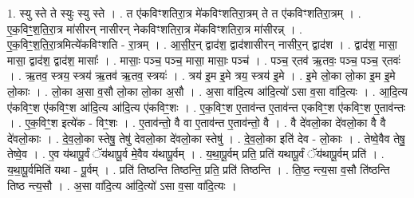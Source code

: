 \documentclass[17pt]{extarticle}
\begin{document}
1. स्यु स्ते ते स्युः स्यु स्ते । . त ए॑कविꣳशतिरा॒त्र मे॑कविꣳशतिरा॒त्रम् ते त ए॑कविꣳशतिरा॒त्रम् । . ए॒क॒विꣳ॒॒श॒ति॒रा॒त्र मा॑सीरन् नासीरन् नेकविꣳशतिरा॒त्र मे॑कविꣳशतिरा॒त्र मा॑सीरन्न् । . ए॒क॒विꣳ॒॒श॒ति॒रा॒त्रमित्ये॑कविꣳशति - रा॒त्रम् । . आ॒सी॒र॒न् द्वाद॑श॒ द्वाद॑शासीरन् नासीर॒न् द्वाद॑श । . द्वाद॑श॒ मासा॒ मासा॒ द्वाद॑श॒ द्वाद॑श॒ मासाः᳚ । . मासाः॒ पञ्च॒ पञ्च॒ मासा॒ मासाः॒ पञ्च॑ । . पञ्च॒ र्‌तव॑ ऋ॒तवः॒ पञ्च॒ पञ्च॒ र्‌तवः॑ । . ऋ॒तव॒ स्त्रय॒ स्त्रय॑ ऋ॒तव॑ ऋ॒तव॒ स्त्रयः॑ । . त्रय॑ इ॒म इ॒मे त्रय॒ स्त्रय॑ इ॒मे । . इ॒मे लो॒का लो॒का इ॒म इ॒मे लो॒काः । . लो॒का अ॒सा व॒सौ लो॒का लो॒का अ॒सौ । . अ॒सा वा॑दि॒त्य आ॑दि॒त्यो॑ ऽसा व॒सा वा॑दि॒त्यः । . आ॒दि॒त्य ए॑कविꣳ॒॒श ए॑कविꣳ॒॒श आ॑दि॒त्य आ॑दि॒त्य ए॑कविꣳ॒॒शः । . ए॒क॒विꣳ॒॒श ए॒ताव॑न्त ए॒ताव॑न्त एकविꣳ॒॒श ए॑कविꣳ॒॒श ए॒ताव॑न्तः । . ए॒क॒विꣳ॒॒श इत्ये॑क - विꣳ॒॒शः । . ए॒ताव॑न्तो॒ वै वा ए॒ताव॑न्त ए॒ताव॑न्तो॒ वै । . वै दे॑वलो॒का दे॑वलो॒का वै वै दे॑वलो॒काः । . दे॒व॒लो॒का स्तेषु॒ तेषु॑ देवलो॒का दे॑वलो॒का स्तेषु॑ । . दे॒व॒लो॒का इति॑ देव - लो॒काः । . तेष्वे॒वैव तेषु॒ तेष्वे॒व । . ए॒व य॑थापू॒र्वं ॅय॑थापू॒र्व मे॒वैव य॑थापू॒र्वम् । . य॒था॒पू॒र्वम् प्रति॒ प्रति॑ यथापू॒र्वं ॅय॑थापू॒र्वम् प्रति॑ । . य॒था॒पू॒र्वमिति॑ यथा - पू॒र्वम् । . प्रति॑ तिष्ठन्ति तिष्ठन्ति॒ प्रति॒ प्रति॑ तिष्ठन्ति । . ति॒ष्ठ॒ न्त्य॒सा व॒सौ ति॑ष्ठन्ति तिष्ठ न्त्य॒सौ । . अ॒सा वा॑दि॒त्य आ॑दि॒त्यो॑ ऽसा व॒सा वा॑दि॒त्यः । \newline
\end{document}
